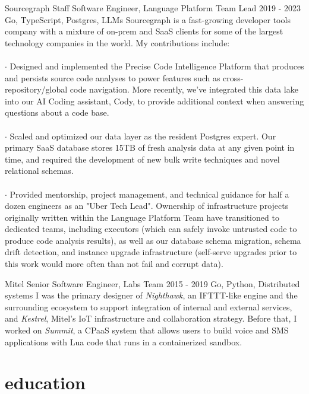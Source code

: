 \documentclass[]{clean-resume}
\begin{document}
\pagebreak
\detailentry
  {Sourcegraph}
  {Staff Software Engineer, Language Platform Team Lead}
  {2019 - 2023}
  {Go, TypeScript, Postgres, LLMs}
  {
    Sourcegraph is a fast-growing developer tools company with a mixture of on-prem and SaaS clients for some of the largest technology companies in the world. My contributions include: \\\\
    \phantom{~~}\hspace{-1em}$\cdot$ Designed and implemented the Precise Code Intelligence Platform that produces and persists source code analyses to power features such as cross-repository/global code navigation. More recently, we've integrated this data lake into our AI Coding assistant, Cody, to provide additional context when answering questions about a code base. \\\\
    \phantom{~~}\hspace{-1em}$\cdot$ Scaled and optimized our data layer as the resident Postgres expert. Our primary SaaS database stores 15TB of fresh analysis data at any given point in time, and required the development of new bulk write techniques and novel relational schemas. \\\\
    \phantom{~~}\hspace{-1em}$\cdot$ Provided mentorship, project management, and technical guidance for half a dozen engineers as an "Uber Tech Lead". Ownership of infrastructure projects originally written within the Language Platform Team have transitioned to dedicated teams, including executors (which can safely invoke untrusted code to produce code analysis results), as well as our database schema migration, schema drift detection, and instance upgrade infrastructure (self-serve upgrades prior to this work would more often than not fail and corrupt data).
  }

\detailentry
  {Mitel}
  {Senior Software Engineer, Labs Team}
  {2015 - 2019}
  {Go, Python, Distributed systems}
  {
    I was the primary designer of \emph{Nighthawk}, an IFTTT-like engine and the surrounding ecosystem to support integration of internal and external services, and \emph{Kestrel}, Mitel's IoT infrastructure and collaboration strategy. Before that, I worked on \emph{Summit}, a CPaaS system that allows users to build voice and SMS applications with Lua code that runs in a containerized sandbox.
  }

\section{education}
\end{document}
